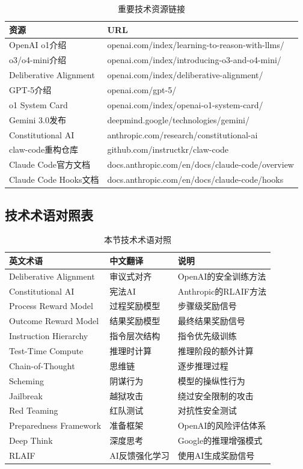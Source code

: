 \documentclass[12pt,a4paper]{article}
\begin{document}
\begin{table}[H]
\centering
\small
\caption{重要技术资源链接}
\begin{tabular}{p{3.6cm}p{8.4cm}}
\toprule
\textbf{资源} & \textbf{URL} \\
\midrule
OpenAI o1介绍 & openai.com/index/learning-to-reason-with-llms/ \\
o3/o4-mini介绍 & openai.com/index/introducing-o3-and-o4-mini/ \\
Deliberative Alignment & openai.com/index/deliberative-alignment/ \\
GPT-5介绍 & openai.com/gpt-5/ \\
o1 System Card & openai.com/index/openai-o1-system-card/ \\
Gemini 3.0发布 & deepmind.google/technologies/gemini/ \\
Constitutional AI & anthropic.com/research/constitutional-ai \\
claw-code重构仓库 & github.com/instructkr/claw-code \\
Claude Code官方文档 & docs.anthropic.com/en/docs/claude-code/overview \\
Claude Code Hooks文档 & docs.anthropic.com/en/docs/claude-code/hooks \\
\bottomrule
\end{tabular}
\end{table}

\subsection{技术术语对照表}

\begin{table}[H]
\centering
\caption{本节技术术语对照}
\begin{tabular}{lll}
\toprule
\textbf{英文术语} & \textbf{中文翻译} & \textbf{说明} \\
\midrule
Deliberative Alignment & 审议式对齐 & OpenAI的安全训练方法 \\
Constitutional AI & 宪法AI & Anthropic的RLAIF方法 \\
Process Reward Model & 过程奖励模型 & 步骤级奖励信号 \\
Outcome Reward Model & 结果奖励模型 & 最终结果奖励信号 \\
Instruction Hierarchy & 指令层次结构 & 指令优先级训练 \\
Test-Time Compute & 推理时计算 & 推理阶段的额外计算 \\
Chain-of-Thought & 思维链 & 逐步推理过程 \\
Scheming & 阴谋行为 & 模型的操纵性行为 \\
Jailbreak & 越狱攻击 & 绕过安全限制的攻击 \\
Red Teaming & 红队测试 & 对抗性安全测试 \\
Preparedness Framework & 准备框架 & OpenAI的风险评估体系 \\
Deep Think & 深度思考 & Google的推理增强模式 \\
RLAIF & AI反馈强化学习 & 使用AI生成奖励信号 \\
\bottomrule
\end{tabular}
\end{table}
\end{document}
